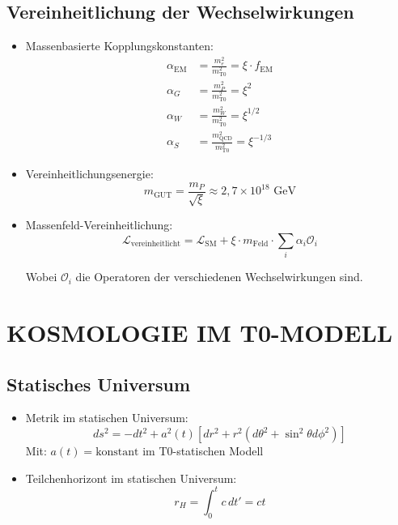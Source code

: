 \documentclass[12pt,a4paper]{article}
\begin{document}
\subsection{Vereinheitlichung der Wechselwirkungen}
\begin{itemize}
	\item Massenbasierte Kopplungskonstanten:
	\begin{align}
		\alpha_{\text{EM}} &= \frac{m_e^2}{m_{\text{T0}}^2} = \xi \cdot f_{\text{EM}} \\
		\alpha_G &= \frac{m_P^2}{m_{\text{T0}}^2} = \xi^2 \\
		\alpha_W &= \frac{m_W^2}{m_{\text{T0}}^2} = \xi^{1/2} \\
		\alpha_S &= \frac{m_{\text{QCD}}^2}{m_{\text{T0}}^2} = \xi^{-1/3}
	\end{align}
	
	\item Vereinheitlichungsenergie:
	\begin{equation}
		m_{\text{GUT}} = \frac{m_P}{\sqrt{\xi}} \approx 2,7 \times 10^{18} \text{ GeV}
	\end{equation}
	
	\item Massenfeld-Vereinheitlichung:
	\begin{equation}
		\mathcal{L}_{\text{vereinheitlicht}} = \mathcal{L}_{\text{SM}} + \xi \cdot m_{\text{Feld}} \cdot \sum_i \alpha_i \mathcal{O}_i
	\end{equation}
	
	Wobei $\mathcal{O}_i$ die Operatoren der verschiedenen Wechselwirkungen sind.
\end{itemize}	
	\section{KOSMOLOGIE IM T0-MODELL}
	
	\subsection{Statisches Universum}
	\begin{itemize}
		\item Metrik im statischen Universum:
		\begin{equation}
			ds^2 = -dt^2 + a^2(t)[dr^2 + r^2(d\theta^2 + \sin^2\theta d\phi^2)]
		\end{equation}
		Mit: $a(t) = \text{konstant}$ im T0-statischen Modell
		
		\item Teilchenhorizont im statischen Universum:
		\begin{equation}
			r_H = \int_0^t c \, dt' = ct
		\end{equation}
	\end{itemize}
	
\end{document}
